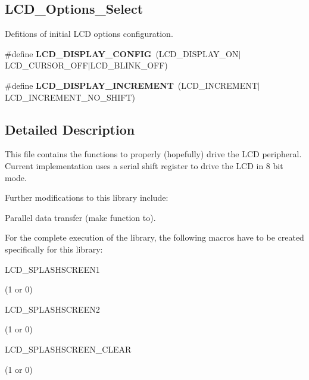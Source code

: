 \subsection*{L\-C\-D\-\_\-\-Options\-\_\-\-Select}
\label{_amgrp6672ce23feaf23832633efd81f58063b}%
Defitions of initial L\-C\-D options configuration. \begin{DoxyCompactItemize}
\item 
\hypertarget{group__lcd__h_ga4f2c8e26ccc5cf79276816b6e3ce072e}{\#define {\bfseries L\-C\-D\-\_\-\-D\-I\-S\-P\-L\-A\-Y\-\_\-\-C\-O\-N\-F\-I\-G}~(L\-C\-D\-\_\-\-D\-I\-S\-P\-L\-A\-Y\-\_\-\-O\-N$\vert$L\-C\-D\-\_\-\-C\-U\-R\-S\-O\-R\-\_\-\-O\-F\-F$\vert$L\-C\-D\-\_\-\-B\-L\-I\-N\-K\-\_\-\-O\-F\-F)}\label{group__lcd__h_ga4f2c8e26ccc5cf79276816b6e3ce072e}

\item 
\hypertarget{group__lcd__h_ga3342673e030aa53067050b74629c7f78}{\#define {\bfseries L\-C\-D\-\_\-\-D\-I\-S\-P\-L\-A\-Y\-\_\-\-I\-N\-C\-R\-E\-M\-E\-N\-T}~(L\-C\-D\-\_\-\-I\-N\-C\-R\-E\-M\-E\-N\-T$\vert$L\-C\-D\-\_\-\-I\-N\-C\-R\-E\-M\-E\-N\-T\-\_\-\-N\-O\-\_\-\-S\-H\-I\-F\-T)}\label{group__lcd__h_ga3342673e030aa53067050b74629c7f78}

\end{DoxyCompactItemize}


\subsection{Detailed Description}
This file contains the functions to properly (hopefully) drive the L\-C\-D peripheral. Current implementation uses a serial shift register to drive the L\-C\-D in 8 bit mode.

Further modifications to this library include\-:
\begin{DoxyItemize}
\item Parallel data transfer (make function to).
\end{DoxyItemize}

For the complete execution of the library, the following macros have to be created specifically for this library\-:
\begin{DoxyItemize}
\item L\-C\-D\-\_\-\-S\-P\-L\-A\-S\-H\-S\-C\-R\-E\-E\-N1 \par
 (1 or 0)
\item L\-C\-D\-\_\-\-S\-P\-L\-A\-S\-H\-S\-C\-R\-E\-E\-N2 \par
 (1 or 0)
\item L\-C\-D\-\_\-\-S\-P\-L\-A\-S\-H\-S\-C\-R\-E\-E\-N\-\_\-\-C\-L\-E\-A\-R \par
 (1 or 0)
\end{DoxyItemize}

